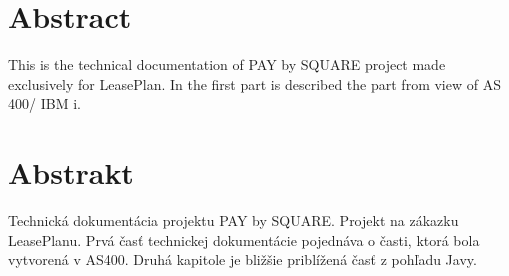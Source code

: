 \chapter*{Abstract}

This is the technical documentation of PAY by SQUARE project made exclusively for LeasePlan. In the first part is described the part from view of AS 400/ IBM i. 

\clearpage

\chapter*{Abstrakt}

Technická dokumentácia projektu PAY by SQUARE. Projekt na zákazku LeasePlanu. Prvá časť technickej dokumentácie pojednáva o časti, ktorá bola vytvorená v AS400. Druhá kapitole je bližšie priblížená časť z pohľadu Javy.  